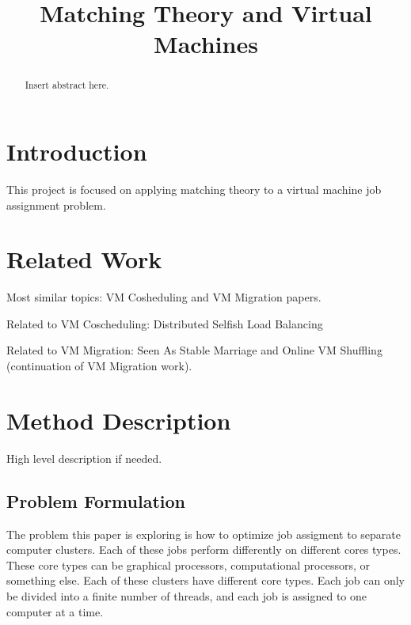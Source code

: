 \documentclass[conference]{IEEEtran}
\begin{document}
%
\title{Matching Theory and Virtual Machines}


\author{
\and
{}
}


\maketitle


\begin{abstract}
Insert abstract here.
\end{abstract}


\section{Introduction}
This project is focused on applying matching theory to a 
virtual machine job assignment problem.  



\section{Related Work}
Most similar topics:  VM Cosheduling and 
VM Migration papers.

Related to VM Coscheduling: Distributed Selfish Load
Balancing

Related to VM Migration:  Seen As Stable Marriage and
Online VM Shuffling (continuation of VM Migration work).

\section{Method Description}
High level description if needed.
\subsection{Problem Formulation}
The problem this paper is exploring is how to optimize job 
assigment to separate computer clusters.  Each of these
jobs perform differently on different cores types.  These
core types can be graphical processors, computational
processors, or something else.  Each of these clusters
have different core types.  Each job can only be divided into
a finite number of threads, and each job is assigned to 
one computer at a time.
\end{document}
